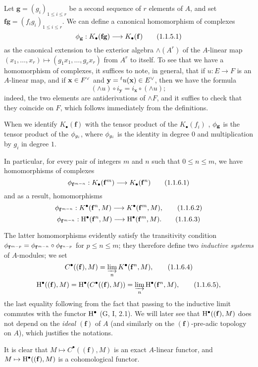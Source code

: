 \begin{env}[1.1.5]
\label{III.1.1.5}
Let $\mathbf{g}=(g_i)_{1\leq i\leq r}$ be a second sequence of $r$ elements of $A$, and set $\mathbf{f}\mathbf{g}=(f_i g_i)_{1\leq i\leq r}$.
We can define a canonical homomorphism of complexes
\[
  \vphi_\mathbf{g}:K_\bullet(\mathbf{f}\mathbf{g})\to K_\bullet(\mathbf{f})
  \tag{1.1.5.1}
\]
as the canonical extension to the exterior algebra $\wedge(A^r)$ of the $A$-linear map $(x_1,\dots,x_r)\mapsto(g_1 x_1,\dots,g_r x_r)$ from $A^r$ to itself.
To see that we have a homomorphism of complexes, it suffices to note, in general, that if $u:E\to F$ is an $A$-linear map, and if $\mathbf{x}\in{F}^\vee$ and $\mathbf{y}={}^t u(\mathbf{x})\in{E}^\vee$, then we have the formula
\[
  (\wedge u)\circ i_\mathbf{y}=i_\mathbf{x}\circ(\wedge u);
  \tag{1.1.5.2}
\]
indeed, the two elements are antiderivations of $\wedge F$, and it suffies to check that they coincide on $F$, which follows immediately from the definitions.

When we identify $K_\bullet(\mathbf{f})$ with the tensor product of the $K_\bullet(f_i)$ , $\phi_\mathbf{g}$ is the tensor product of the $\phi_{g_i}$, where $\phi_{g_i}$ is the identity in degree $0$ and multiplication by $g_i$ in degree $1$.
\end{env}

\begin{env}[1.1.6]
\label{III.1.1.6}
In particular, for every pair of integers $m$ and $n$ such that $0\leq n\leq m$, we have homomorphisms of complexes
\[
  \vphi_{\mathbf{f}^{m-n}}:K_\bullet(\mathbf{f}^m)\to K_\bullet(\mathbf{f}^n)
  \tag{1.1.6.1}
\]
and as a result, homomorphisms
\[
  \vphi_{\mathbf{f}^{m-n}}:K^\bullet(\mathbf{f}^n,M)\to K^\bullet(\mathbf{f}^m,M),
  \tag{1.1.6.2}
\]
\[
  \vphi_{\mathbf{f}^{m-n}}:\HH^\bullet(\mathbf{f}^n,M)\to\HH^\bullet(\mathbf{f}^m,M).
  \tag{1.1.6.3}
\]

The latter homomorphisms evidently satisfy the transitivity condition $\phi_{\mathbf{f}^{m-p}}=\phi_{\mathbf{f}^{m-n}}\circ\phi_{\mathbf{f}^{n-p}}$ for $p\leq n\leq m$; they therefore define two \emph{inductive systems} of $A$-modules; we set
\[
  C^\bullet((\mathbf{f}),M)=\varinjlim_n K^\bullet(\mathbf{f}^n,M),
  \tag{1.1.6.4}
\]
\[
  \mathrm{H}^\bullet((\mathbf{f}),M)=\mathrm{H}^\bullet(C^\bullet((\mathbf{f}),M))=\varinjlim_n\mathrm{H}^\bullet(\mathbf{f}^n,M),
  \tag{1.1.6.5},
\]
the last equality following from the fact that passing to the inductive limit commutes with the functor $\mathrm{H}^\bullet$ (G, I, 2.1).
We will later see  that $\mathrm{H}^\bullet((\mathbf{f}),M)$ does not depend on the \emph{ideal $(\mathbf{f})$} of $A$ (and similarly on the $(\mathbf{f})$-pre-adic topology on $A$), which justifies the notations.

It is clear that $M\mapsto C^\bullet((\mathbf{f}),M)$ is an exact $A$-linear functor, and $M\mapsto\HH^\bullet((\mathbf{f}),M)$ is a cohomological functor.
\end{env}


